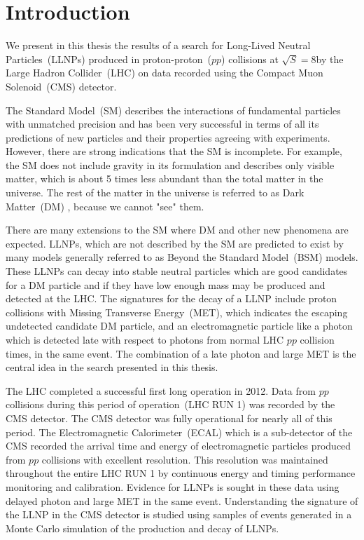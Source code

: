 \chapter{Introduction}
We present in this thesis the results of a search for Long-Lived Neutral Particles~(LLNPs) produced in proton-proton~($pp$) collisions at $\sqrt{S} = 8$\TeV by the Large Hadron Collider~(LHC) on data recorded using the Compact Muon Solenoid~(CMS) detector.
\par 
The Standard Model~(SM) describes the interactions of fundamental particles with unmatched precision and has been very successful in terms of all its predictions of new particles and their properties  agreeing with experiments. However, there are strong indications that the SM is incomplete. For example, the SM does not include gravity in its formulation and describes only visible matter, which is
about 5 times less abundant than the total matter in the universe. The rest of the matter in the universe is referred to as Dark Matter~(DM) \cite{DM,SUSYDM,LSPDM}, because we cannot "see" them.
\par 
There are many extensions to the SM where DM and other new phenomena are expected. LLNPs, which are not described by the SM are predicted to exist by many models generally referred to as Beyond the Standard Model~(BSM) models. These LLNPs can decay into stable neutral particles which are good candidates for a DM particle and if they have low enough mass may be produced and detected at the LHC. The signatures for the decay of a LLNP include proton collisions with Missing Transverse Energy~(MET), which indicates the escaping undetected candidate DM particle, and an electromagnetic particle like a photon which is detected late with respect to photons from normal LHC $pp$ collision times, in the same event. The combination of a late photon and large MET is the central idea in the search presented in this thesis.
\par
The LHC completed a successful first long operation in 2012. Data from $pp$ collisions during this period of operation~(LHC RUN 1) was recorded by the CMS detector. The CMS detector was fully operational for nearly all of this period. The Electromagnetic Calorimeter~(ECAL) which is a sub-detector of the CMS recorded the arrival time and energy of electromagnetic particles produced from $pp$ collisions with excellent resolution. This resolution was maintained throughout the entire LHC RUN 1 by continuous energy and timing performance monitoring and calibration. Evidence for LLNPs is sought in these data using delayed photon and large MET in the same event. Understanding the signature of the LLNP in the CMS detector is studied using samples of events generated in a Monte Carlo simulation of the production and decay of LLNPs.
